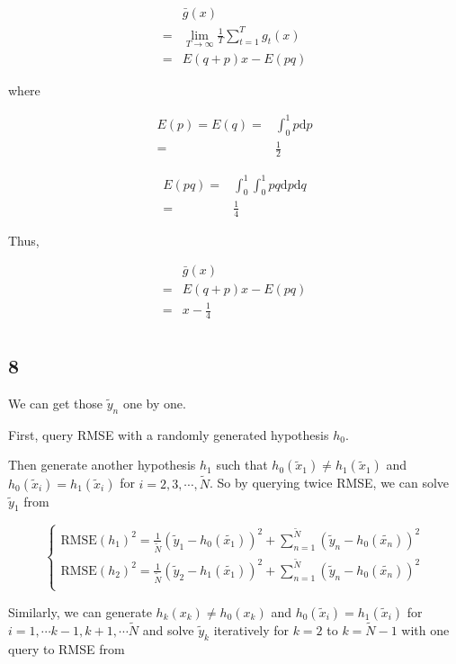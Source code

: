\documentclass[fleqn,a4paper,12pt]{article}
\begin{document}
\begin{align*}
  &  \bar{g}(x) \\
  =& \lim_{T \to \infty} \frac{1}{T} \sum_{t=1}^T g_t(x) \\
  =& E(q + p) x - E(p q)
\end{align*}

where

\begin{align*}
  E(p) = E(q)
  =& \int_0^1 p \mathrm{d} p \\
  =& \frac{1}{2}
\end{align*}


\begin{align*}
  E(p q) 
  =& \int_0^1 \int_0^1 p q \mathrm{d} p \mathrm{d} q\\
  =& \frac{1}{4}
\end{align*}

Thus,

\begin{align*}
  &  \bar{g}(x) \\
  =& E(q + p) x - E(p q) \\
  =& x - \frac{1}{4} \\   
\end{align*}

\subsection*{8}

We can get those $\tilde{y}_n$ one by one.

First, query RMSE with a randomly generated hypothesis $h_0$.

Then generate another hypothesis $h_1$ such that $h_0(\tilde{x}_1) \ne h_1(\tilde{x}_1)$ and $h_0(\tilde{x}_i) = h_1(\tilde{x}_i)$ for $i = 2, 3, \cdots, \tilde{N}$. So by querying twice RMSE, we can solve $\tilde{y}_1$ from

\[
\begin{cases}
  \mathrm{RMSE}(h_1)^2 = \frac{1}{\tilde{N}} (\tilde{y}_1 - h_0(\tilde{x_1}))^2 + \sum_{n=1}^{\tilde{N}} (\tilde{y}_n - h_0(\tilde{x_n}))^2 \\
  \mathrm{RMSE}(h_2)^2 = \frac{1}{\tilde{N}} (\tilde{y}_2 - h_1(\tilde{x_1}))^2 + \sum_{n=1}^{\tilde{N}} (\tilde{y}_n - h_0(\tilde{x_n}))^2 \\
\end{cases}
\]


Similarly, we can generate $h_k(x_k) \ne h_0(x_k)$ and $h_0(\tilde{x}_i) = h_1(\tilde{x}_i)$ for $i = 1, \cdots k - 1, k + 1, \cdots \tilde{N}$ and solve $\tilde{y}_k$ iteratively for $k = 2$ to $k = \tilde{N} - 1$ with one query to RMSE from 
\end{document}
